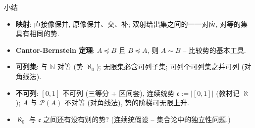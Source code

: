 \begin{frame}{小结}

\begin{itemize}
\item \textbf{映射}: 直接像保并, 原像保并、交、补; 双射给出集之间的一一对应, 对等的集具有相同的势.
\item \textbf{Cantor-Bernstein 定理}: $A \preccurlyeq B$ 且 $B \preccurlyeq A$, 则 $A \sim B$ -- 比较势的基本工具.
\item \textbf{可列集}: 与 $\mathbb{N}$ 对等 (势 $\aleph_0$); 无限集必含可列子集; 可列个可列集之并可列 (对角线法).
\item \textbf{不可列}: $[0,1]$ 不可列 (三等分 + 区间套), 连续统势 $\mathfrak{c} := |[0,1]|$ (教材记 $\aleph$);
$A$ 与 $\mathscr{P}(A)$ 不对等 (对角线法), 势的阶梯可无限上升.
\end{itemize}

\pause

\begin{question}
\begin{itemize}
\item $\aleph_0$ 与 $\mathfrak{c}$ 之间还有没有别的势? (连续统假设 -- 集合论中的独立性问题.)
\end{itemize}
\end{question}

\end{frame}


